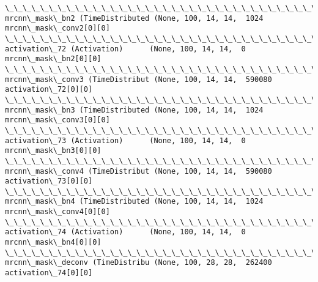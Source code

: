 \documentclass[11pt]{article}
\begin{document}
\begin{Verbatim}[commandchars=\\\{\}]
\_\_\_\_\_\_\_\_\_\_\_\_\_\_\_\_\_\_\_\_\_\_\_\_\_\_\_\_\_\_\_\_\_\_\_\_\_\_\_\_\_\_\_\_\_\_\_\_\_\_\_\_\_\_\_\_\_\_\_\_\_\_\_\_\_\_\_\_\_\_\_\_\_\_\_\_\_\_\_\_\_\_\_\_\_\_\_\_\_\_\_\_\_\_\_\_\_\_
mrcnn\_mask\_bn2 (TimeDistributed (None, 100, 14, 14,  1024        mrcnn\_mask\_conv2[0][0]           
\_\_\_\_\_\_\_\_\_\_\_\_\_\_\_\_\_\_\_\_\_\_\_\_\_\_\_\_\_\_\_\_\_\_\_\_\_\_\_\_\_\_\_\_\_\_\_\_\_\_\_\_\_\_\_\_\_\_\_\_\_\_\_\_\_\_\_\_\_\_\_\_\_\_\_\_\_\_\_\_\_\_\_\_\_\_\_\_\_\_\_\_\_\_\_\_\_\_
activation\_72 (Activation)      (None, 100, 14, 14,  0           mrcnn\_mask\_bn2[0][0]             
\_\_\_\_\_\_\_\_\_\_\_\_\_\_\_\_\_\_\_\_\_\_\_\_\_\_\_\_\_\_\_\_\_\_\_\_\_\_\_\_\_\_\_\_\_\_\_\_\_\_\_\_\_\_\_\_\_\_\_\_\_\_\_\_\_\_\_\_\_\_\_\_\_\_\_\_\_\_\_\_\_\_\_\_\_\_\_\_\_\_\_\_\_\_\_\_\_\_
mrcnn\_mask\_conv3 (TimeDistribut (None, 100, 14, 14,  590080      activation\_72[0][0]              
\_\_\_\_\_\_\_\_\_\_\_\_\_\_\_\_\_\_\_\_\_\_\_\_\_\_\_\_\_\_\_\_\_\_\_\_\_\_\_\_\_\_\_\_\_\_\_\_\_\_\_\_\_\_\_\_\_\_\_\_\_\_\_\_\_\_\_\_\_\_\_\_\_\_\_\_\_\_\_\_\_\_\_\_\_\_\_\_\_\_\_\_\_\_\_\_\_\_
mrcnn\_mask\_bn3 (TimeDistributed (None, 100, 14, 14,  1024        mrcnn\_mask\_conv3[0][0]           
\_\_\_\_\_\_\_\_\_\_\_\_\_\_\_\_\_\_\_\_\_\_\_\_\_\_\_\_\_\_\_\_\_\_\_\_\_\_\_\_\_\_\_\_\_\_\_\_\_\_\_\_\_\_\_\_\_\_\_\_\_\_\_\_\_\_\_\_\_\_\_\_\_\_\_\_\_\_\_\_\_\_\_\_\_\_\_\_\_\_\_\_\_\_\_\_\_\_
activation\_73 (Activation)      (None, 100, 14, 14,  0           mrcnn\_mask\_bn3[0][0]             
\_\_\_\_\_\_\_\_\_\_\_\_\_\_\_\_\_\_\_\_\_\_\_\_\_\_\_\_\_\_\_\_\_\_\_\_\_\_\_\_\_\_\_\_\_\_\_\_\_\_\_\_\_\_\_\_\_\_\_\_\_\_\_\_\_\_\_\_\_\_\_\_\_\_\_\_\_\_\_\_\_\_\_\_\_\_\_\_\_\_\_\_\_\_\_\_\_\_
mrcnn\_mask\_conv4 (TimeDistribut (None, 100, 14, 14,  590080      activation\_73[0][0]              
\_\_\_\_\_\_\_\_\_\_\_\_\_\_\_\_\_\_\_\_\_\_\_\_\_\_\_\_\_\_\_\_\_\_\_\_\_\_\_\_\_\_\_\_\_\_\_\_\_\_\_\_\_\_\_\_\_\_\_\_\_\_\_\_\_\_\_\_\_\_\_\_\_\_\_\_\_\_\_\_\_\_\_\_\_\_\_\_\_\_\_\_\_\_\_\_\_\_
mrcnn\_mask\_bn4 (TimeDistributed (None, 100, 14, 14,  1024        mrcnn\_mask\_conv4[0][0]           
\_\_\_\_\_\_\_\_\_\_\_\_\_\_\_\_\_\_\_\_\_\_\_\_\_\_\_\_\_\_\_\_\_\_\_\_\_\_\_\_\_\_\_\_\_\_\_\_\_\_\_\_\_\_\_\_\_\_\_\_\_\_\_\_\_\_\_\_\_\_\_\_\_\_\_\_\_\_\_\_\_\_\_\_\_\_\_\_\_\_\_\_\_\_\_\_\_\_
activation\_74 (Activation)      (None, 100, 14, 14,  0           mrcnn\_mask\_bn4[0][0]             
\_\_\_\_\_\_\_\_\_\_\_\_\_\_\_\_\_\_\_\_\_\_\_\_\_\_\_\_\_\_\_\_\_\_\_\_\_\_\_\_\_\_\_\_\_\_\_\_\_\_\_\_\_\_\_\_\_\_\_\_\_\_\_\_\_\_\_\_\_\_\_\_\_\_\_\_\_\_\_\_\_\_\_\_\_\_\_\_\_\_\_\_\_\_\_\_\_\_
mrcnn\_mask\_deconv (TimeDistribu (None, 100, 28, 28,  262400      activation\_74[0][0]              

\end{Verbatim}
\end{document}
